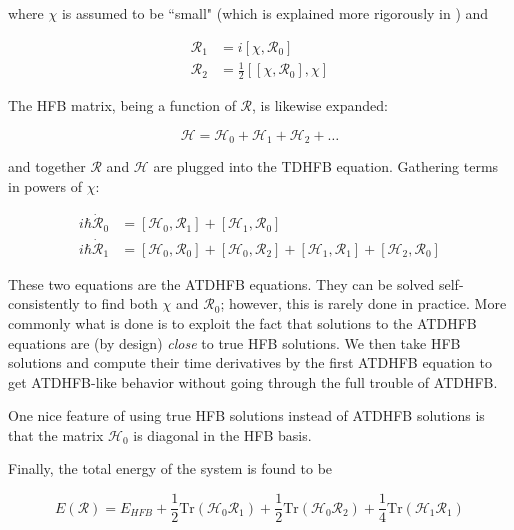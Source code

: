\noindent where $\chi$ is assumed to be ``small" (which is explained more rigorously in \cite{Baranger1978}) and

\begin{align}\label{eqn:densities}
\mathcal{R}_1 &= i\left[\chi, \mathcal{R}_0\right] \\
\mathcal{R}_2 &= \frac{1}{2}\left[\left[\chi, \mathcal{R}_0\right], \chi\right] 
\end{align}

\noindent The HFB matrix, being a function of $\mathcal{R}$, is likewise expanded:

\begin{equation*}
\mathcal{H} = \mathcal{H}_0 + \mathcal{H}_1 + \mathcal{H}_2 + \dots
\end{equation*}

\noindent and together $\mathcal{R}$ and $\mathcal{H}$ are plugged into the TDHFB equation. Gathering terms in powers of $\chi$:

\begin{align}\label{eqn:ATDHFB}
i\hbar\mathcal{\dot{R}}_0 &= \left[\mathcal{H}_0, \mathcal{R}_1\right] + \left[\mathcal{H}_1, \mathcal{R}_0\right] \\
i\hbar\mathcal{\dot{R}}_1 &= \left[\mathcal{H}_0, \mathcal{R}_0\right] + \left[\mathcal{H}_0, \mathcal{R}_2\right]
 + \left[\mathcal{H}_1, \mathcal{R}_1\right] + \left[\mathcal{H}_2, \mathcal{R}_0\right]
\end{align}

\noindent These two equations are the ATDHFB equations. They can be solved self-consistently to find both $\chi$ and $\mathcal{R}_0$; however, this is rarely done in practice. More commonly what is done is to exploit the fact that solutions to the ATDHFB equations are (by design) \textit{close} to true HFB solutions. We then take HFB solutions and compute their time derivatives by the first ATDHFB equation to get ATDHFB-like behavior without going through the full trouble of ATDHFB.

One nice feature of using true HFB solutions instead of ATDHFB solutions is that the matrix $\mathcal{H}_0$ is diagonal in the HFB basis.

Finally, the total energy of the system is found to be

\begin{equation*}
E(\mathcal{R}) = E_{HFB} + \frac{1}{2}\mathrm{Tr}\left(\mathcal{H}_0\mathcal{R}_1\right) + \frac{1}{2}\mathrm{Tr}\left(\mathcal{H}_0\mathcal{R}_2\right) + \frac{1}{4}\mathrm{Tr}\left(\mathcal{H}_1\mathcal{R}_1\right)
\end{equation*}

